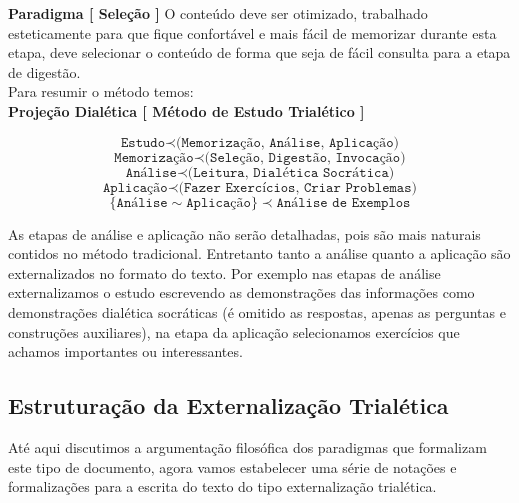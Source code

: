 \textbf{Paradigma [ Seleção ]} O conteúdo deve ser otimizado, trabalhado esteticamente para que fique confortável e mais fácil de memorizar durante esta etapa, deve selecionar o conteúdo de forma que seja de fácil consulta para a etapa de digestão.\\

Para resumir o método temos:\\

\textbf{Projeção Dialética [ Método de Estudo Trialético ]}

$$ \texttt{Estudo} \prec \texttt{(Memorização, Análise, Aplicação)} $$
$$ \texttt{Memorização} \prec \texttt{(Seleção, Digestão, Invocação)} $$
$$ \texttt{Análise} \prec \texttt{(Leitura, Dialética Socrática)} $$
$$ \texttt{Aplicação} \prec \texttt{(Fazer Exercícios, Criar Problemas)} $$
$$ \{ \texttt{Análise} \sim \texttt{Aplicação} \} \prec \texttt{Análise de Exemplos}$$

As etapas de análise e aplicação não serão detalhadas, pois são mais naturais contidos no método tradicional. Entretanto tanto a análise quanto a aplicação são externalizados no formato do texto. Por exemplo nas etapas de análise externalizamos o estudo escrevendo as demonstrações das informações como demonstrações dialética socráticas (é omitido as respostas, apenas as perguntas e construções auxiliares), na etapa da aplicação selecionamos exercícios que achamos importantes ou interessantes.



\subsection{Estruturação da Externalização Trialética}

\hspace{\baselineskip}

Até aqui discutimos a argumentação filosófica dos paradigmas que formalizam este tipo de documento, agora vamos estabelecer uma série de notações e formalizações para a escrita do texto do tipo externalização trialética.

